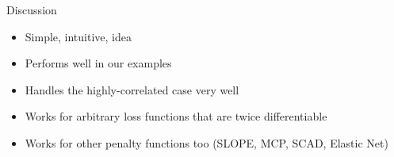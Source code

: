 \documentclass[10pt,ignorenonframetext]{beamer}
\newif\ifbibliography
\begin{document}
\begin{frame}{Discussion}
  \begin{itemize}
    \item Simple, intuitive, idea
    \item Performs well in our examples
    \item Handles the highly-correlated case very well
    \item Works for arbitrary loss functions that are twice differentiable
    \item Works for other penalty functions too (SLOPE, MCP, SCAD, Elastic Net)
  \end{itemize}
\end{frame}

\end{document}
